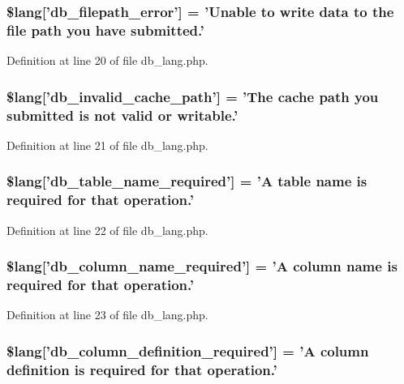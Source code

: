 \subsubsection[{\$lang}]{\setlength{\rightskip}{0pt plus 5cm}\$lang['db\-\_\-filepath\-\_\-error'] = 'Unable {\bf to} {\bf write} data {\bf to} the file path you have submitted.'}\label{db__lang_8php_a0519c50a806cec99f29b499aec2582e5}


Definition at line 20 of file db\-\_\-lang.\-php.

\subsubsection[{\$lang}]{\setlength{\rightskip}{0pt plus 5cm}\$lang['db\-\_\-invalid\-\_\-cache\-\_\-path'] = 'The cache path you submitted is {\bf not} valid {\bf or} writable.'}\label{db__lang_8php_a67157df2896b342e247ab744adf2b9e5}


Definition at line 21 of file db\-\_\-lang.\-php.

\subsubsection[{\$lang}]{\setlength{\rightskip}{0pt plus 5cm}\$lang['db\-\_\-table\-\_\-name\-\_\-required'] = 'A table name is required {\bf for} that operation.'}\label{db__lang_8php_a2899cf8f7246d7fa97660ea52856ade5}


Definition at line 22 of file db\-\_\-lang.\-php.

\subsubsection[{\$lang}]{\setlength{\rightskip}{0pt plus 5cm}\$lang['db\-\_\-column\-\_\-name\-\_\-required'] = 'A column name is required {\bf for} that operation.'}\label{db__lang_8php_ac87ab86a1f105d87327480b6d0659b13}


Definition at line 23 of file db\-\_\-lang.\-php.

\subsubsection[{\$lang}]{\setlength{\rightskip}{0pt plus 5cm}\$lang['db\-\_\-column\-\_\-definition\-\_\-required'] = 'A column definition is required {\bf for} that operation.'}\label{db__lang_8php_ad0ba270704ec81f8f89e486a18660354}


